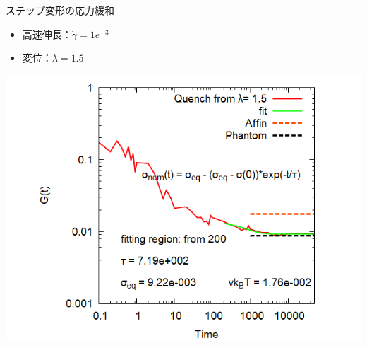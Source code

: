 \documentclass[12pt, dvipdfmx]{beamer}
\begin{document}
\begin{frame}
\begin{columns}[totalwidth=\linewidth]
\begin{exampleblock}{ステップ変形の応力緩和}
\begin{itemize}
                        \item 高速伸長：$\dot{\gamma} = 1e^{-3}$
                        \item 変位：$\lambda = 1.5$
                    \end{itemize}
					\begin{center}
                        \includegraphics[width=.9\columnwidth]{gt_sunuke.png}
                    \end{center}
				\end{exampleblock}
		\end{columns}
\end{frame}
\end{document}
